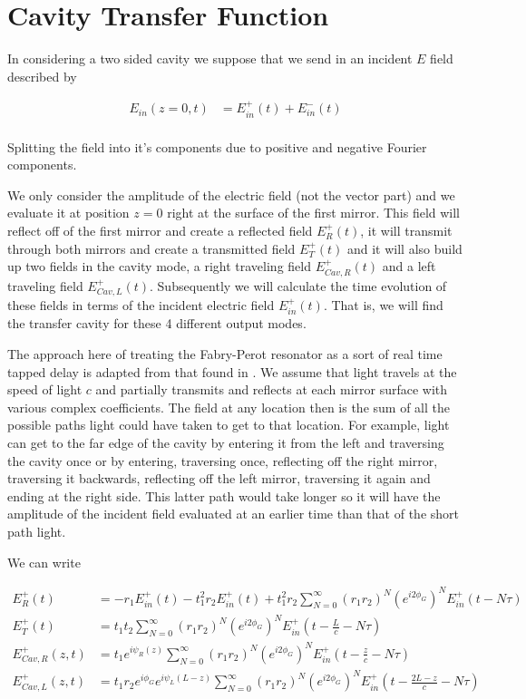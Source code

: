 \documentclass[12pt]{article}
\begin{document}
\section{Cavity Transfer Function}

In considering a two sided cavity we suppose that we send in an incident $E$ field described by

\begin{align}
E_{in}(z=0,t) &= E_{in}^+(t) + E_{in}^-(t)\\
\end{align}

Splitting the field into it's components due to positive and negative Fourier components.

We only consider the amplitude of the electric field (not the vector part) and we evaluate it at position $z=0$ right at the surface of the first mirror. This field will reflect off of the first mirror and create a reflected field $E_R^+(t)$, it will transmit through both mirrors and create a transmitted field $E_T^+(t)$ and it will also build up two fields in the cavity mode, a right traveling field $E_{Cav,R}^+(t)$ and a left traveling field $E_{Cav,L}^+(t)$. Subsequently we will calculate the time evolution of these fields in terms of the incident electric field $E_{in}^+(t)$. That is, we will find the transfer cavity for these 4 different output modes.

The approach here of treating the Fabry-Perot resonator as a sort of real time tapped delay is adapted from that found in \cite{Xiao2011, Sanchez-Soto2016}. We assume that light travels at the speed of light $c$ and partially transmits and reflects at each mirror surface with various complex coefficients. The field at any location then is the sum of all the possible paths light could have taken to get to that location. For example, light can get to the far edge of the cavity by entering it from the left and traversing the cavity once or by entering, traversing once, reflecting off the right mirror, traversing it backwards, reflecting off the left mirror, traversing it again and ending at the right side. This latter path would take longer so it will have the amplitude of the incident field evaluated at an earlier time than that of the short path light.

We can write

\begin{align}
E_R^+(t) &= -r_1 E_{in}^+(t) -t_1^2r_2 E_{in}^+(t) + t_1^2 r_2 \sum_{N=0}^{\infty} (r_1r_2)^N \left(e^{i 2 \phi_G}\right)^N E_{in}^+(t - N\tau)\\
E_T^+(t) &= t_1t_2\sum_{N=0}^{\infty}(r_1r_2)^N \left(e^{i 2 \phi_G}\right)^N E_{in}^+\left(t-\frac{L}{c}-N\tau\right)\\
E_{Cav,R}^+(z,t) &= t_1 e^{i\psi_R(z)} \sum_{N=0}^{\infty} (r_1r_2)^N \left(e^{i 2 \phi_G}\right)^N E_{in}^+\left(t-\frac{z}{c}-N\tau\right)\\
E_{Cav,L}^+(z,t) &= t_1r_2 e^{i\phi_G} e^{i\psi_L(L-z)} \sum_{N=0}^{\infty} (r_1r_2)^N \left(e^{i 2 \phi_G}\right)^N E_{in}^+\left(t-\frac{2L-z}{c} - N\tau\right)
\end{align}
\end{document}
